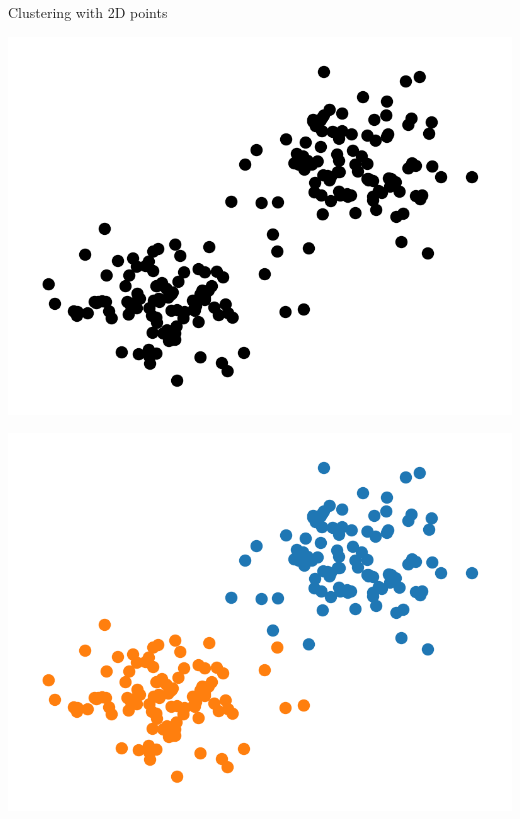 \begin{example}
    \centering
    \caption{Clustering with 2D points}
    \label{ex:clustering}

    \begin{subexample}{\linewidth}
      \centering
      \includegraphics[width=0.9\linewidth]{img/clustering_example_1.png}
    \end{subexample}

    \vspace{0.5cm}

    \begin{subexample}{\linewidth}
      \centering
      \includegraphics[width=0.9\linewidth]{img/clustering_example_2.png}
    \end{subexample}
\end{example}


